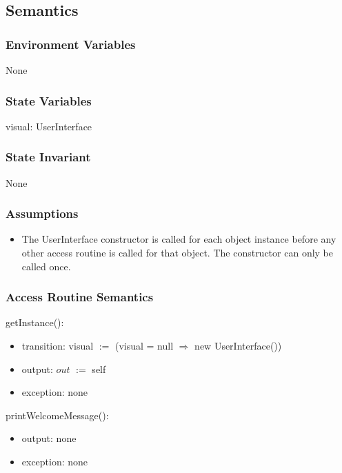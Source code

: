 \documentclass[12pt]{article}
\begin{document}
\subsection* {Semantics}

\subsubsection*{Environment Variables}

None

\subsubsection* {State Variables}

visual: UserInterface

\subsubsection* {State Invariant}

None

\subsubsection* {Assumptions}

\begin{itemize}
\item The UserInterface constructor is called for each object instance before any
other access routine is called for that object.  The constructor can only be
called once.
\end{itemize}

\subsubsection* {Access Routine Semantics}

\noindent getInstance():
\begin{itemize}
  \item transition: visual $:=$ (visual = null $\Rightarrow$ new UserInterface())
  \item output: $out$ $:=$ self
  \item exception: none
\end{itemize}

\noindent printWelcomeMessage():
\begin{itemize}
  \item output: none
  \item exception: none
\end{itemize}
\end{document}
